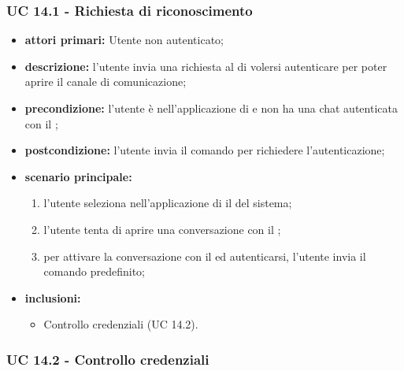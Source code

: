	\subsubsection{UC 14.1 - Richiesta di riconoscimento}

	\begin{itemize}
		\item \textbf{attori primari:} Utente non autenticato;
		\item \textbf{descrizione:} l'utente invia una richiesta al  di volersi autenticare per poter aprire il canale di comunicazione;
		\item \textbf{precondizione:} l'utente è nell'applicazione di  e non ha una chat autenticata con il ;
		\item \textbf{postcondizione:} l'utente invia il comando per richiedere l'autenticazione;
		\item \textbf{scenario principale:}
		\begin{enumerate}
			\item l'utente seleziona nell'applicazione di  il  del sistema;
			\item l'utente tenta di aprire una conversazione con il ;
			\item per attivare la conversazione con il  ed autenticarsi, l'utente invia il comando predefinito;
		\end{enumerate}
		\item \textbf{inclusioni:}
		\begin{itemize}
			\item Controllo credenziali (UC 14.2).
		\end{itemize}
	\end{itemize}

	\subsubsection{UC 14.2 - Controllo credenziali}

